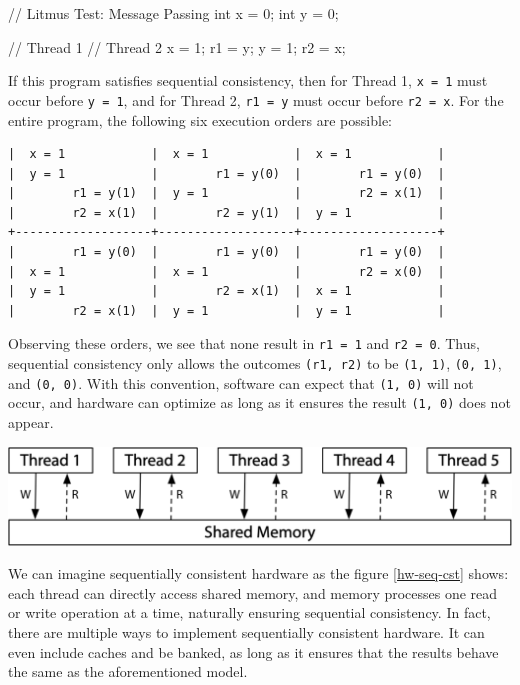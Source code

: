 \documentclass[fontsize=10pt, oneside]{scrartcl}
\newcommand{\monobox}[1]{\mbox{\texttt{#1}}}
\begin{document}
\begin{ccode}
// Litmus Test: Message Passing
int x = 0;
int y = 0;

// Thread 1        // Thread 2
x = 1;             r1 = y;
y = 1;             r2 = x;
\end{ccode}

If this program satisfies sequential consistency, then for Thread 1, \monobox{x = 1} must occur before \monobox{y = 1}, and for Thread 2, \monobox{r1 = y} must occur before \monobox{r2 = x}.
For the entire program, the following six execution orders are possible:

\begin{verbatim}
|  x = 1            |  x = 1            |  x = 1            |
|  y = 1            |        r1 = y(0)  |        r1 = y(0)  |
|        r1 = y(1)  |  y = 1            |        r2 = x(1)  |
|        r2 = x(1)  |        r2 = y(1)  |  y = 1            |
+-------------------+-------------------+-------------------+
|        r1 = y(0)  |        r1 = y(0)  |        r1 = y(0)  |
|  x = 1            |  x = 1            |        r2 = x(0)  |
|  y = 1            |        r2 = x(1)  |  x = 1            |
|        r2 = x(1)  |  y = 1            |  y = 1            |
\end{verbatim}

Observing these orders, we see that none result in \monobox{r1 = 1} and \monobox{r2 = 0}.
Thus, sequential consistency only allows the outcomes \monobox{(r1, r2)} to be \monobox{(1, 1)}, \monobox{(0, 1)}, and \monobox{(0, 0)}.
With this convention, software can expect that \monobox{(1, 0)} will not occur, and hardware can optimize as long as it ensures the result \monobox{(1, 0)} does not appear.

\begin{center}
\includegraphics[keepaspectratio,width=0.7\linewidth]{images/hw-seq-cst}
\label{hw-seq-cst}
\end{center}

We can imagine sequentially consistent hardware as the figure \ref{hw-seq-cst} shows: each thread can directly access shared memory, and memory processes one read or write operation at a time, naturally ensuring sequential consistency.
In fact, there are multiple ways to implement sequentially consistent hardware.
It can even include caches and be banked, as long as it ensures that the results behave the same as the aforementioned model.
\end{document}
